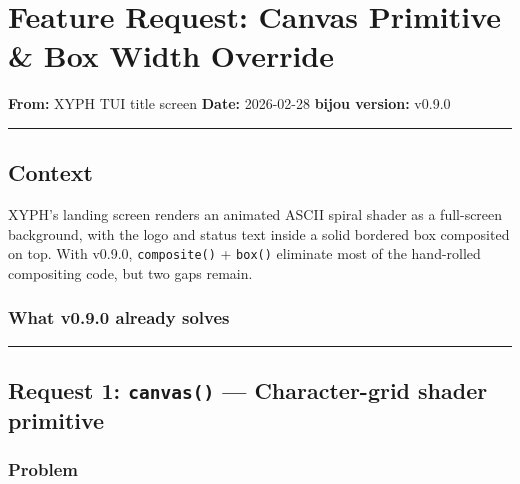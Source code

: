 \chapter{Feature Request: Canvas Primitive \& Box Width Override}\label{record-016}

\smallskip

\textbf{From:} XYPH TUI title screen \textbf{Date:} 2026-02-28 \textbf{bijou version:} v0.9.0

\begin{center}\rule{0.5\linewidth}{0.5pt}\end{center}

\section{Context}\label{record-016-context}

XYPH's landing screen renders an animated ASCII spiral shader as a full-screen background, with the logo and status text inside a solid bordered box composited on top. With v0.9.0, \texttt{c\allowbreak{}o\allowbreak{}m\allowbreak{}p\allowbreak{}o\allowbreak{}s\allowbreak{}i\allowbreak{}t\allowbreak{}e\allowbreak{}(\allowbreak{})} + \texttt{b\allowbreak{}o\allowbreak{}x\allowbreak{}(\allowbreak{})} eliminate most of the hand-rolled compositing code, but two gaps remain.

\subsection{What v0.9.0 already solves}\label{record-016-what-v0.9.0-already-solves}



\begin{center}\rule{0.5\linewidth}{0.5pt}\end{center}

\section{\texorpdfstring{Request 1: \texttt{c\allowbreak{}a\allowbreak{}n\allowbreak{}v\allowbreak{}a\allowbreak{}s\allowbreak{}(\allowbreak{})} --- Character-grid shader primitive}{Request 1:  --- Character-grid shader primitive}}\label{record-016-request-1-canvas-character-grid-shader-primitive}

\subsection{Problem}\label{record-016-problem}

